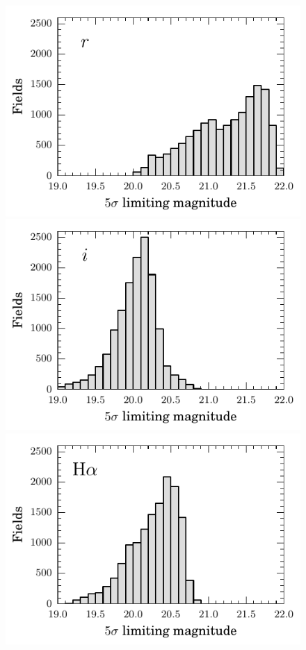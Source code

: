 \documentclass[a4paper,useAMS,usenatbib]{mn2e}
\begin{document}
\begin{figure}
    \begin{minipage}[b]{\linewidth}
        \includegraphics[width=\textwidth]{figures/depth/depth_r.pdf} 
    \end{minipage}
    \begin{minipage}[b]{\linewidth}
        \includegraphics[width=\textwidth]{figures/depth/depth_i.pdf} 
    \end{minipage}
    \begin{minipage}[b]{\linewidth}
        \includegraphics[width=\textwidth]{figures/depth/depth_h.pdf} 

\end{minipage}
\end{figure}
\end{document}
